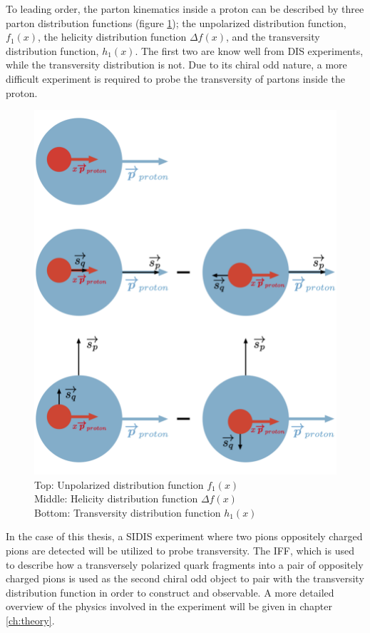 \documentclass[abstract = on,listof=totoc, bibliography=totoc]{scrreprt}
\begin{document}
To leading order, the parton kinematics inside a proton can be described by three parton distribution functions (figure \ref{fig:PDFs}); the unpolarized distribution function, $f_1(x)$, the helicity distribution function $\Delta f (x)$, and the transversity distribution function, $h_1(x)$\cite{JaffeTONS}. The first two are know well from DIS experiments, while the transversity distribution is not. Due to its chiral odd nature, a more difficult experiment is required to probe the transversity of partons inside the proton.  
\begin{figure}
\begin{center}
\includegraphics[width = .7\textwidth]{allDistsPic3}
\caption[Visual representation of unpolarized, hellicity, and transversity distribution functions]{Top: Unpolarized distribution function $f_1(x)$ \\
Middle: Helicity distribution function $\Delta f(x)$ \\
Bottom: Transversity distribution function $h_1(x)$}
\label{fig:PDFs}
\end{center}
\end{figure}
In the case of this thesis, a SIDIS experiment where two pions oppositely charged pions are detected will be utilized to probe transversity. The IFF, which is used to describe how a transversely polarized quark fragments into a pair of oppositely charged pions is used as the second chiral odd object to pair with the transversity distribution function in order to construct and observable. A more detailed overview of the physics involved in the experiment will be given in chapter \ref{ch:theory}.
\end{document}
